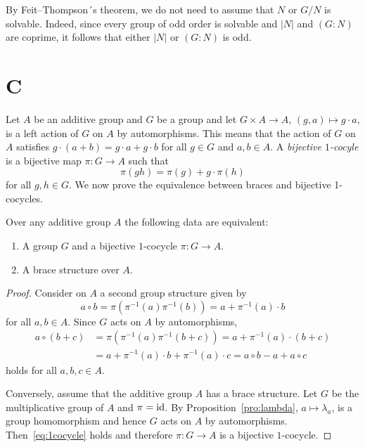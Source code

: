 By Feit--Thompson´s theorem, we do not need to assume that
$N$ or $G/N$ is solvable. Indeed, since every group of odd order is solvable and
$|N|$ and $(G:N)$ are coprime, it follows that either $|N|$ or $(G:N)$ is odd. 

\section*{C}

Let $A$ be an additive group and $G$ be a group and let 
$G\times A\to A$, $(g,a)\mapsto g\cdot a$,
is a left action of $G$ on $A$ by automorphisms. This means that the action of $G$ on $A$ satisfies 
$g\cdot (a+b)=g\cdot a+g\cdot b$ for all $g\in G$ and $a,b\in A$.
A \emph{bijective
$1$-cocyle} is a bijective map $\pi\colon G\to A$ such that 
\begin{equation}
    \label{eq:1cocycle}
    \pi(gh)=\pi(g)+g\cdot \pi(h)
\end{equation}
for all $g,h\in G$. 
We now prove the equivalence between braces and bijective 1-cocycles. 

\begin{theorem}
	\label{thm:1cocycle}
    Over any additive group $A$ the following data are equivalent:
    \begin{enumerate}
        \item A group $G$ and a bijective
            $1$-cocycle $\pi\colon G\to A$. 
        \item A brace structure over $A$. 
    \end{enumerate}

    \begin{proof}
        Consider on $A$ a second group structure given by 
        \[
		a\circ b=\pi(\pi^{-1}(a)\pi^{-1}(b))=a+\pi^{-1}(a)\cdot b
		\]
		for all
        $a,b\in A$.  Since $G$ acts on $A$ by
        automorphisms, 
        \begin{align*}
            a\circ (b+c)&=\pi(\pi^{-1}(a)\pi^{-1}(b+c))=a+\pi^{-1}(a)\cdot (b+c)\\
            &=a+ \pi^{-1}(a)\cdot b+\pi^{-1}(a)\cdot c
            =a\circ b-a+a\circ c
        \end{align*}
        holds for all $a,b,c\in A$.
        
        Conversely, assume that the additive group $A$ has a brace structure. Let $G$ be the multiplicative group of $A$
        and $\pi=\operatorname{id}$. By
        Proposition~\ref{pro:lambda}, $a\mapsto\lambda_a$, is a group homomorphism and 
        hence $G$ acts on $A$ by automorphisms. Then~\eqref{eq:1cocycle} holds
        and therefore $\pi\colon G\to A$ is a bijective $1$-cocycle. 
    \end{proof}
\end{theorem}

